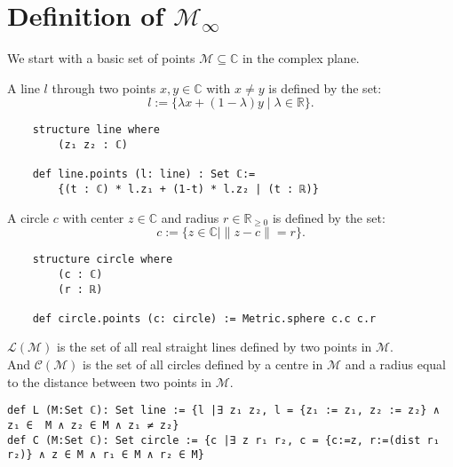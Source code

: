 \section{Definition of $\mathcal{M}_{\infty}$}
We start with a basic set of points $\mathcal{M} \subseteq \mathbb{C}$ in the complex plane. 

\begin{definition}[Line]
    \label{def:line}
    A line $l$ through two points $x,y\in\mathbb{C}$ with $x\ne y$ is defined by the set: $$l:=\{\lambda x+(1-\lambda)y\mid\lambda\in\mathbb{R}\}.$$
\end{definition}

\begin{lstlisting}
    structure line where
        (z₁ z₂ : ℂ)

    def line.points (l: line) : Set ℂ:= 
        {(t : ℂ) * l.z₁ + (1-t) * l.z₂ | (t : ℝ)}
\end{lstlisting}

\begin{definition}[Circle]
    \label{def:circle}
    A circle $c$ with center $z\in\mathbb{C}$ and radius $r\in\mathbb{R}_{\ge 0}$ is defined by the set: $$c:=\{z\in\mathbb{C} \mid\|z-c\|=r\}.$$
\end{definition}

\begin{lstlisting}
    structure circle where
        (c : ℂ)
        (r : ℝ)

    def circle.points (c: circle) := Metric.sphere c.c c.r
\end{lstlisting}


\begin{definition}
    \label{def:set_of_lines_and_circles}
    $\mathcal{L(M)}$ is the set of all real straight lines defined by two points in $\mathcal{M}$.\\
    And $\mathcal{C(M)}$ is the set of all circles defined by a centre in $\mathcal{M}$ and a radius equal to the distance between two points in $\mathcal{M}$.
\end{definition}

\begin{lstlisting}
def L (M:Set ℂ): Set line := {l |∃ z₁ z₂, l = {z₁ := z₁, z₂ := z₂} ∧ z₁ ∈  M ∧ z₂ ∈ M ∧ z₁ ≠ z₂}
def C (M:Set ℂ): Set circle := {c |∃ z r₁ r₂, c = {c:=z, r:=(dist r₁ r₂)} ∧ z ∈ M ∧ r₁ ∈ M ∧ r₂ ∈ M}
\end{lstlisting}


